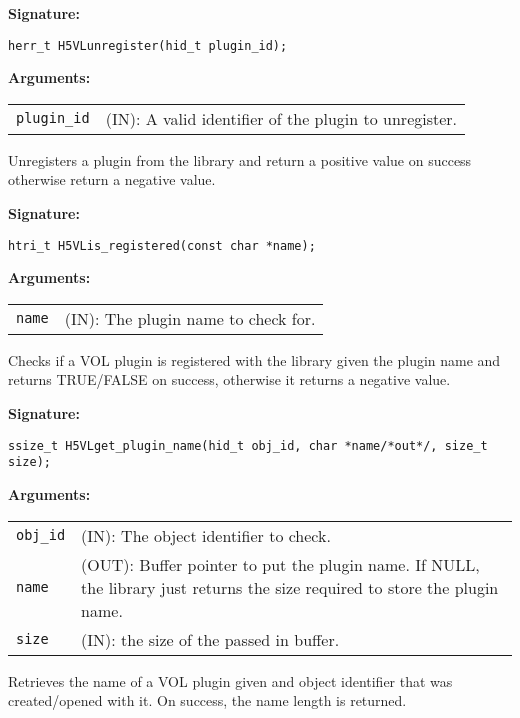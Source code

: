 \begin{mdframed}[style=bgbox]
\textbf{Signature:}
\begin{lstlisting}
herr_t H5VLunregister(hid_t plugin_id);
\end{lstlisting}
\textbf{Arguments:}\\
\begin{tabular}{l p{13.5cm}}
  {\tt plugin\_id} & (IN): A valid identifier of the plugin to unregister.\\
\end{tabular}
\end{mdframed}
Unregisters a plugin from the library and return a positive value on success otherwise return a negative value.\bigskip


\begin{mdframed}[style=bgbox]
\textbf{Signature:}
\begin{lstlisting}
htri_t H5VLis_registered(const char *name);
\end{lstlisting}
\textbf{Arguments:}\\
\begin{tabular}{l p{13.5cm}}
  {\tt name} & (IN): The plugin name to check for.\\
\end{tabular}
\end{mdframed}
Checks if a VOL plugin is registered with the library given the plugin name and returns TRUE/FALSE on success, otherwise it returns a negative value.\bigskip


\begin{mdframed}[style=bgbox]
\textbf{Signature:}
\begin{lstlisting}
ssize_t H5VLget_plugin_name(hid_t obj_id, char *name/*out*/, size_t size);
\end{lstlisting}

\textbf{Arguments:}\\
\begin{tabular}{l p{13.5cm}}
  {\tt obj\_id} & (IN): The object identifier to check.\\
  {\tt name} & (OUT): Buffer pointer to put the plugin name. If NULL, the library just returns the size required to store the plugin name.\\
  {\tt size} & (IN): the size of the passed in buffer.\\
\end{tabular}
\end{mdframed}
Retrieves the name of a VOL plugin given and object identifier that was created/opened with it. On success, the name length is returned.\bigskip


